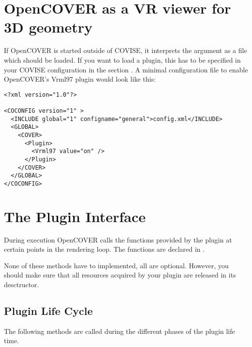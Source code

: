 \section{OpenCOVER as a VR viewer for 3D geometry}

If OpenCOVER is started outside of COVISE, it interprets the argument as a file which 
should be loaded. If you want to load a plugin, this has to be specified
in your COVISE configuration in the section .
A minimal configuration file to enable OpenCOVER's Vrml97 plugin would look like this:
\begin{verbatim}
<?xml version="1.0"?>

<COCONFIG version="1" >
  <INCLUDE global="1" configname="general">config.xml</INCLUDE>
  <GLOBAL>
    <COVER>
      <Plugin>
        <Vrml97 value="on" />
      </Plugin>
    </COVER>
  </GLOBAL>
</COCONFIG>
\end{verbatim}


\section{The Plugin Interface}

During execution OpenCOVER calls the functions provided by the plugin at certain 
points in the rendering loop. The functions are declared in . 

None of these methods have to implemented, all are optional.
However, you should make sure that all resources acquired by your plugin are released
in its desctructor.

\subsection{Plugin Life Cycle}

The following methods are called during the different phases of the plugin life time.

